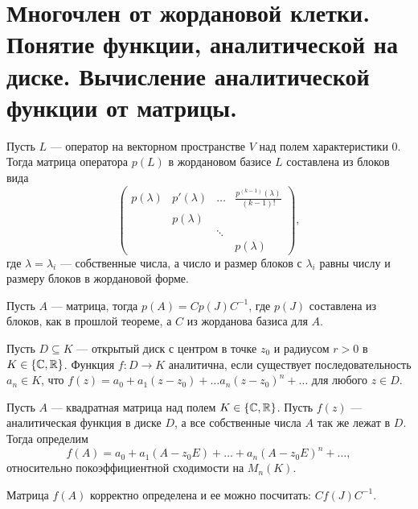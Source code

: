 \section{Многочлен от жордановой клетки. Понятие функции, аналитической на диске. Вычисление аналитической функции от матрицы.}
\begin{thm}
    Пусть $ L$ --- оператор на векторном пространстве  $ V$ над полем характеристики $ 0$. Тогда матрица оператора  $ p(L)$ в жордановом базисе  $ L$ составлена из блоков вида
     \[
    \begin{pmatrix}
	p(\lambda) & p'( \lambda ) & \ldots & \frac{p^{(k-1)}(\lambda)}{(k-1)!} \\
		   & p( \lambda ) && \\
		   & & \ddots & \\
		   &&& p(\lambda)
    \end{pmatrix}
    ,\] 
    где $ \lambda = \lambda _i$ --- собственные числа, а число и размер блоков с $ \lambda _i$ равны числу и размеру блоков в жордановой форме.
\end{thm}
\begin{cor}
    Пусть $ A$ --- матрица, тогда  $ p(A) = C p(J) C^{-1}$, где $ p(J)$ составлена из блоков, как в прошлой теореме, а  $ C$ из жорданова базиса для  $ A$.
\end{cor}

\begin{defn}
    Пусть $ D \subseteq K$ --- открытый диск с центром в точке $ z_0$ и радиусом $ r >0$ в  $ K \in \{\mathbb{C}, \mathbb{R}\}$. Функция $ f\colon D \to  K$ {\sf аналитична}, если существует последовательность $ a_n \in K$, что $ f(z) = a_0+ a_1(z-z_0) + \ldots a_n(z-z_0)^{n} + \ldots $ для любого $ z \in D$.  
\end{defn}

\begin{defn}
    Пусть $ A $ ---  квадратная матрица над полем $ K \in \{\mathbb{C}, \mathbb{R}\}$. Пусть $ f(z)$ --- аналитическая функция в диске  $ D$, а все собственные числа  $ A$ так же лежат в  $ D$. Тогда определим 
     \[
	 f(A) = a_0 + a_1(A- z_0E) + \ldots +a_n(A- z_0E)^{n} + \ldots 
    ,\] 
    относительно покоэффициентной сходимости на $ M_n(K)$. 
    \begin{note}
	Матрица $ f(A)$ корректно определена и ее можно посчитать: $ C f(J) C^{-1}$.
    \end{note}
\end{defn}


